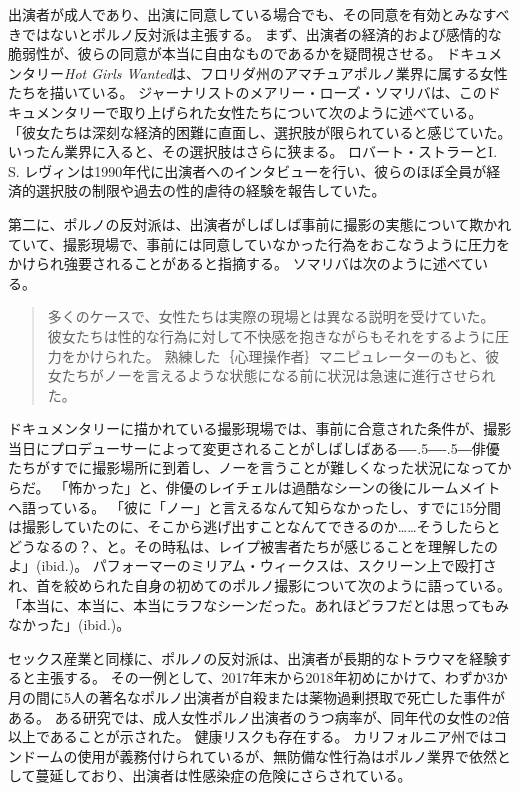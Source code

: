 \documentclass[paper=a4,book,openany]{jlreq}
\newcommand{\ig}[1]{}           %
\def\DDASH{―\kern-.5\zw―\kern-.5\zw―} %
\begin{document}
出演者が成人であり、出演に同意している場合でも、その同意を有効とみなすべきではないとポルノ反対派は主張する。
まず、出演者の経済的および感情的な脆弱性が、彼らの同意が本当に自由なものであるかを疑問視させる。
ドキュメンタリー\emph{Hot Girls Wanted}は、フロリダ州のアマチュアポルノ業界に属する女性たちを描いている。
ジャーナリストのメアリー・ローズ・ソマリバは、このドキュメンタリーで取り上げられた女性たちについて次のように述べている。
「彼女たちは深刻な経済的困難に直面し、選択肢が限られていると感じていた。
いったん業界に入ると、その選択肢はさらに狭まる\citep{somarriba15:_porn_indus_is_abusiv_these}。
ロバート・ストラーとI. S. レヴィンは1990年代に出演者へのインタビューを行い、彼らのほぼ全員が経済的選択肢の制限や過去の性的虐待の経験を報告していた\citep{stoller93:_comin_attrac}。

第二に、ポルノの反対派は、出演者がしばしば事前に撮影の実態について欺かれていて、撮影現場で、事前には同意していなかった行為をおこなうように圧力をかけられ強要されることがあると指摘する。
ソマリバは次のように述べている。

\begin{quote}
多くのケースで、女性たちは実際の現場とは異なる説明を受けていた。
彼女たちは性的な行為に対して不快感を抱きながらもそれをするように圧力をかけられた。
熟練した｛心理操作者｝{マニピュレーター}のもと、彼女たちがノーを言えるような状態になる前に状況は急速に進行させられた。
\citep{somarriba15:_porn_indus_is_abusiv_these}
\end{quote}

ドキュメンタリーに描かれている撮影現場では、事前に合意された条件が、撮影当日にプロデューサーによって変更されることがしばしばある{\DDASH}俳優たちがすでに撮影場所に到着し、ノーを言うことが難しくなった状況になってからだ。
「怖かった」と、俳優のレイチェルは過酷なシーンの後にルームメイトへ語っている。
「彼に「ノー」と言えるなんて知らなかったし、すでに15分間は撮影していたのに、そこから逃げ出すことなんてできるのか……そうしたらとどうなるの？、と。その時私は、レイプ被害者たちが感じることを理解したのよ」(ibid.)。
パフォーマーのミリアム・ウィークスは、スクリーン上で殴打され、首を絞められた自身の初めてのポルノ撮影について次のように語っている。
「本当に、本当に、本当にラフなシーンだった。あれほどラフだとは思ってもみなかった」(ibid.)。

セックス産業と同様に、ポルノの反対派は、出演者が長期的なトラウマを経験すると主張する。
その一例として、2017年末から2018年初めにかけて、わずか3か月の間に5人の著名なポルノ出演者が自殺または薬物過剰摂取で死亡した事件がある。
ある研究では、成人女性ポルノ出演者のうつ病率が、同年代の女性の2倍以上であることが示された\citep{grudzen01:_compar_mental_healt_femal_adult}。
健康リスクも存在する。
カリフォルニア州ではコンドームの使用が義務付けられているが、無防備な性行為はポルノ業界で依然として蔓延しており、出演者は性感染症\ig{(STI)}の危険にさらされている\citep{coyne09:_sexual_healt_adult_workin_pornog_films}。
\end{document}
